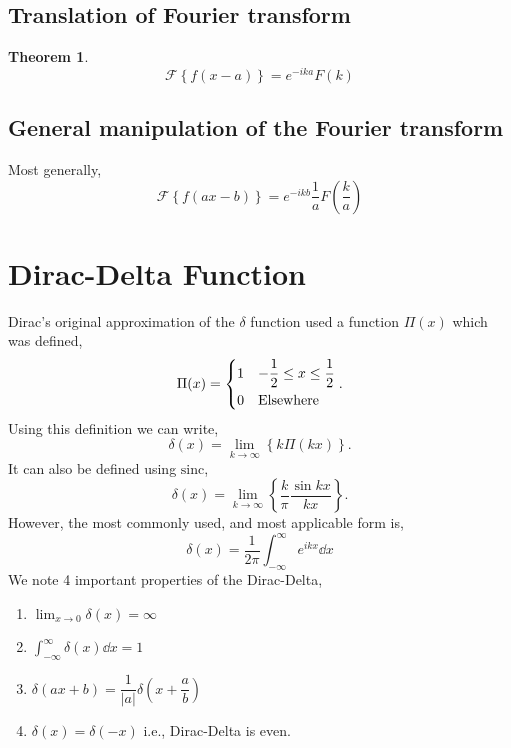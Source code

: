 \documentclass{book}
\newtheorem*{theorem}{Theorem}
\begin{document}
\subsection{Translation of Fourier transform}
\begin{theorem}
	\begin{equation}
		\boxed{\mathscr{F}\left\{f(x - a)\right\} = e^{-ika}F(k)}
	\end{equation}
\end{theorem}
\subsection{General manipulation of the Fourier transform}
Most generally,
\begin{equation}
	\boxed{\mathscr{F}\left\{f(ax - b)\right\} = e^{-ikb}\frac{1}{a}F\left(\frac{k}{a}\right)}
\end{equation}
\section{Dirac-Delta Function}
Dirac's original approximation of the $\delta$ function used a function $\Pi(x)$ which was defined,
\begin{equation}
	\Pi(x) = \begin{dcases}
		1 & -\frac{1}{2} \leq x \leq \frac{1}{2} \\
		0 & \text{Elsewhere}
	\end{dcases}.
\end{equation}
Using this definition we can write,
\begin{equation}
	\delta(x) = \lim_{k \to \infty} \left\{k\Pi(kx)\right\}.
\end{equation}
It can also be defined using $\mathrm{sinc}$,
\begin{equation}
	\delta(x) = \lim_{k \to \infty}\left\{\frac{k}{\pi}\frac{\sin{kx}}{kx}\right\}.
\end{equation}
However, the most commonly used, and most applicable form is,
\begin{equation}
	\boxed{\delta(x) = \frac{1}{2\pi}\int_{-\infty}^{\infty}e^{ikx}\dd{x}}
\end{equation}
We note 4 important properties of the Dirac-Delta,
\begin{enumerate}
	\item $\displaystyle \lim_{x \to 0}\delta(x) = \infty$ 
	\item $\displaystyle \int_{-\infty}^{\infty}\delta(x)\dd{x} = 1$
	\item $\displaystyle \delta(ax + b) = \dfrac{1}{|a|}\delta\left(x + \dfrac{a}{b}\right)$
	\item $\delta(x) = \delta(-x)$ i.e., Dirac-Delta is even.
\end{enumerate}
\end{document}
